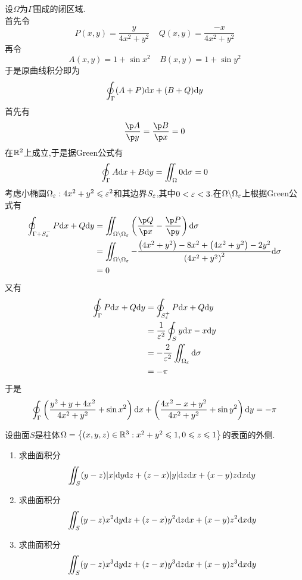 \documentclass{ctexart}
\begin{document}
\begin{solution}
    设$\Omega$为$\Gamma$围成的闭区域.\\
    首先令
    \[P(x,y)=\dfrac{y}{4x^2+y^2}\ \ \ \ \ Q(x,y)=\dfrac{-x}{4x^2+y^2}\]
    再令
    \[A(x,y)=1+\sin x^2\ \ \ \ \ B(x,y)=1+\sin y^2\]
    于是原曲线积分即为
    \[\oint_{\Gamma}(A+P)\mathrm{d} x+(B+Q)\mathrm{d} y\]
    首先有
    \[\dfrac{\p A}{\p y}=\dfrac{\p B}{\p x}=0\]
    在$\mathbb{R}^2$上成立,于是据Green公式有
    \[\oint_{\Gamma}A\mathrm{d} x+B\mathrm{d} y=\iint_{\Omega}0\mathrm{d}\sigma=0\]
    考虑小椭圆$\Omega_\varepsilon:4x^2+y^2\leqslant\varepsilon^2$和其边界$S_\varepsilon$,其中$0<\varepsilon<3$.在$\Omega\backslash\Omega_\varepsilon$上根据Green公式有
    \[\begin{aligned}
        \oint_{\Gamma+S_\ep^-}P\di x+Q\di y
        &= \iint_{\Omega\backslash\Omega_\ep}\left(\dfrac{\p Q}{\p x}-\dfrac{\p P}{\p y}\right)\di\sigma \\
        &= \iint_{\Omega\backslash\Omega_\ep}-\dfrac{\left(4x^2+y^2\right)-8x^2+\left(4x^2+y^2\right)-2y^2}{\left(4x^2+y^2\right)^2}\di\sigma \\
        &= 0
    \end{aligned}\]
    又有
    \[\begin{aligned}
        \oint_{\Gamma}P\mathrm{d} x+Q\mathrm{d} y
        &= \oint_{S_\varepsilon^+}P\mathrm{d} x+Q\mathrm{d} y \\
        &= \dfrac{1}{\varepsilon^2}\oint_Sy\mathrm{d} x-x\mathrm{d} y \\
        &= -\dfrac{2}{\varepsilon^2}\iint_{\Omega_\varepsilon}\mathrm{d}\sigma \\
        &= -\pi
    \end{aligned}\]
    于是
    \[\oint_{\Gamma}\left(\dfrac{y^2+y+4x^2}{4x^2+y^2}+\sin x^2\right)\mathrm{d} x+\left(\dfrac{4x^2-x+y^2}{4x^2+y^2}+\sin y^2\right)\mathrm{d} y=-\pi\]

\end{solution}
\begin{problem}[10.(10\songti{分})]
    设曲面$S$是柱体$\Omega=\left\{(x,y,z)\in\mathbb{R}^3:x^2+y^2\leqslant1,0\leqslant z\leqslant1\right\}$的表面的外侧.
    \begin{enumerate}[label=\tbf{(\arabic*)}]
        \item 求曲面积分
            \[\iint_S(y-z)|x|\mathrm{d} y\mathrm{d} z+(z-x)|y|\mathrm{d} z\mathrm{d} x+(x-y)z\mathrm{d} x\mathrm{d} y\]
        \item 求曲面积分
            \[\iint_S(y-z)x^2\mathrm{d} y\mathrm{d} z+(z-x)y^2\mathrm{d} z\mathrm{d} x+(x-y)z^2\mathrm{d} x\mathrm{d} y\]
        \item 求曲面积分
            \[\iint_S(y-z)x^3\mathrm{d} y\mathrm{d} z+(z-x)y^3\mathrm{d} z\mathrm{d} x+(x-y)z^3\mathrm{d} x\mathrm{d} y\]
    \end{enumerate}
\end{problem}
\end{document}

